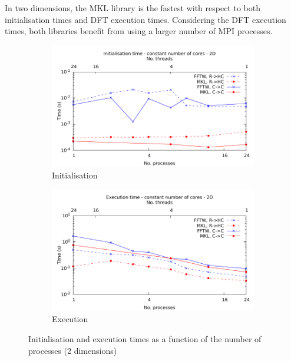 \documentclass[12pt, a4paper]{article} \setlength{\textheight}{24cm}
\begin{document}
In two dimensions, the MKL library is the fastest with respect to both
initialisation times and DFT execution times. Considering the DFT
execution times, both libraries benefit from using a larger number of
MPI processes.

\begin{figure}[H]
  \centering
  \begin{subfigure}{.5\textwidth}
    \centering
    \includegraphics[width=.9\linewidth]{graphs/const-init-2d.pdf}
    \caption{Initialisation}
    \label{2DCONSTI}
  \end{subfigure}%
  \begin{subfigure}{.5\textwidth}
    \centering
    \includegraphics[width=.9\linewidth]{graphs/const-exec-2d.pdf}
    \caption{Execution}
    \label{2DCONSTE}
  \end{subfigure}
  \caption{Initialisation and execution times as a function of the
    number of processes (2 dimensions)}
  \label{2DCONST}
\end{figure}
\end{document}
